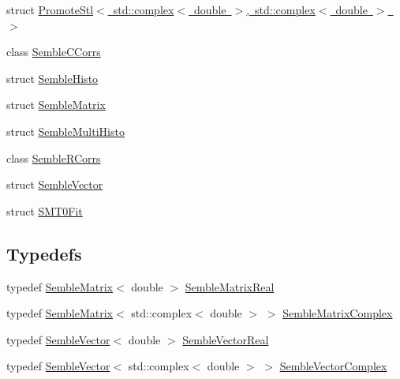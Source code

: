 \begin{DoxyCompactItemize}
\item 
struct \mbox{\hyperlink{structSEMBLE_1_1PromoteStl_3_01std_1_1complex_3_01double_01_4_00_01std_1_1complex_3_01double_01_4_01_4}{Promote\+Stl$<$ std\+::complex$<$ double $>$, std\+::complex$<$ double $>$ $>$}}
\item 
class \mbox{\hyperlink{classSEMBLE_1_1SembleCCorrs}{Semble\+C\+Corrs}}
\item 
struct \mbox{\hyperlink{structSEMBLE_1_1SembleHisto}{Semble\+Histo}}
\item 
struct \mbox{\hyperlink{structSEMBLE_1_1SembleMatrix}{Semble\+Matrix}}
\item 
struct \mbox{\hyperlink{structSEMBLE_1_1SembleMultiHisto}{Semble\+Multi\+Histo}}
\item 
class \mbox{\hyperlink{classSEMBLE_1_1SembleRCorrs}{Semble\+R\+Corrs}}
\item 
struct \mbox{\hyperlink{structSEMBLE_1_1SembleVector}{Semble\+Vector}}
\item 
struct \mbox{\hyperlink{structSEMBLE_1_1SMT0Fit}{S\+M\+T0\+Fit}}
\end{DoxyCompactItemize}
\subsection*{Typedefs}
\begin{DoxyCompactItemize}
\item 
typedef \mbox{\hyperlink{structSEMBLE_1_1SembleMatrix}{Semble\+Matrix}}$<$ double $>$ \mbox{\hyperlink{namespaceSEMBLE_afdaf09320dfddbf64a27bf64b119b5c6}{Semble\+Matrix\+Real}}
\item 
typedef \mbox{\hyperlink{structSEMBLE_1_1SembleMatrix}{Semble\+Matrix}}$<$ std\+::complex$<$ double $>$ $>$ \mbox{\hyperlink{namespaceSEMBLE_a8b417450e7274f86ee69dc99cd81fc85}{Semble\+Matrix\+Complex}}
\item 
typedef \mbox{\hyperlink{structSEMBLE_1_1SembleVector}{Semble\+Vector}}$<$ double $>$ \mbox{\hyperlink{namespaceSEMBLE_aafb98a4e7384ac5396f2462f686872cc}{Semble\+Vector\+Real}}
\item 
typedef \mbox{\hyperlink{structSEMBLE_1_1SembleVector}{Semble\+Vector}}$<$ std\+::complex$<$ double $>$ $>$ \mbox{\hyperlink{namespaceSEMBLE_a8b1f4df2e46e109e63e004981b9498da}{Semble\+Vector\+Complex}}
\end{DoxyCompactItemize}
